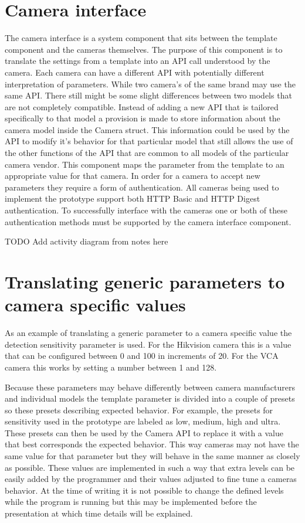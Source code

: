 \section{Camera interface}
The camera interface is a system component that sits between the template component and the cameras themselves. The purpose of this component
is to translate the settings from a template into an API call understood by the camera. Each camera can have a different API with potentially different interpretation of parameters.
While two camera's of the same brand may use the same API.
There still might be some slight differences between two models that are not completely compatible.
Instead of adding a new API that is tailored specifically to that model a provision is made to store information about the camera model inside the Camera struct.
This information could be used by the API to modify it's behavior for that particular model that still allows the use of the other functions of the API that are common to all models of the particular camera vendor.
This component maps the parameter from the template to an appropriate value for that camera.
In order for a camera to accept new parameters they require a form of authentication. All cameras being used to implement the prototype support both HTTP Basic and HTTP Digest authentication.
To successfully interface with the cameras one or both of these authentication methods must be supported by the camera interface component.

TODO Add activity diagram from notes here

\section{Translating generic parameters to camera specific values}
As an example of translating a generic parameter to a camera specific value the detection sensitivity parameter is used.
For the Hikvision camera this is a value that can be configured between 0 and 100 in increments of 20.
For the VCA camera this works by setting a number between 1 and 128.

Because these parameters may behave differently between camera manufacturers and individual models the template parameter is divided into a couple of presets so these presets describing expected behavior.
For example, the presets for sensitivity used in the prototype are labeled as low, medium, high and ultra.
These presets can then be used by the Camera API to replace it with a value that best corresponds the expected behavior.
This way cameras may not have the same value for that parameter but they will behave in the same manner as closely as possible.
These values are implemented in such a way that extra levels can be easily added by the programmer and their values adjusted to fine tune a cameras behavior.
At the time of writing it is not possible to change the defined levels while the program is running but this may be implemented before the presentation at which time details will be explained.

